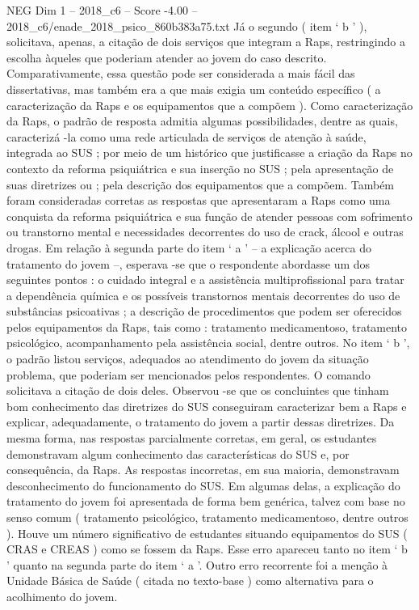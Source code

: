 \begin{textsample}{NEG Dim 1 – 2018\_c6 – Score -4.00 – 2018\_c6/enade\_2018\_psico\_860b383a75.txt}
Já o segundo ( item ‘ b ’ ), solicitava, apenas, a citação de dois serviços que integram a Raps, restringindo a escolha àqueles que poderiam atender ao jovem do caso descrito.
Comparativamente, essa questão pode ser considerada a mais fácil das dissertativas, mas também era a que mais exigia um conteúdo específico ( a caracterização da Raps e os equipamentos que a compõem ).
Como caracterização da Raps, o padrão de resposta admitia algumas possibilidades, dentre as quais, caracterizá -la como uma rede articulada de serviços de atenção à saúde, integrada ao SUS ; por meio de um histórico que justificasse a criação da Raps no contexto da reforma psiquiátrica e sua inserção no SUS ; pela apresentação de suas diretrizes ou ; pela descrição dos equipamentos que a compõem.
Também foram consideradas corretas as respostas que apresentaram a Raps como uma conquista da reforma psiquiátrica e sua função de atender pessoas com sofrimento ou transtorno mental e necessidades decorrentes do uso de crack, álcool e outras drogas.
Em relação à segunda parte do item ‘ a ’ – a explicação acerca do tratamento do jovem –, esperava -se que o respondente abordasse um dos seguintes pontos : o cuidado integral e a assistência multiprofissional para tratar a dependência química e os possíveis transtornos mentais decorrentes do uso de substâncias psicoativas ; a descrição de procedimentos que podem ser oferecidos pelos equipamentos da Raps, tais como : tratamento medicamentoso, tratamento psicológico, acompanhamento pela assistência social, dentre outros.
No item ‘ b ’, o padrão listou serviços, adequados ao atendimento do jovem da situação problema, que poderiam ser mencionados pelos respondentes.
O comando solicitava a citação de dois deles.
Observou -se que os concluintes que tinham bom conhecimento das diretrizes do SUS conseguiram caracterizar bem a Raps e explicar, adequadamente, o tratamento do jovem a partir dessas diretrizes.
Da mesma forma, nas respostas parcialmente corretas, em geral, os estudantes demonstravam algum conhecimento das características do SUS e, por consequência, da Raps.
As respostas incorretas, em sua maioria, demonstravam desconhecimento do funcionamento do SUS.
Em algumas delas, a explicação do tratamento do jovem foi apresentada de forma bem genérica, talvez com base no senso comum ( tratamento psicológico, tratamento medicamentoso, dentre outros ).
Houve um número significativo de estudantes situando equipamentos do SUS ( CRAS e CREAS ) como se fossem da Raps.
Esse erro apareceu tanto no item ‘ b ’ quanto na segunda parte do item ‘ a ’.
Outro erro recorrente foi a menção à Unidade Básica de Saúde ( citada no texto-base ) como alternativa para o acolhimento do jovem.

\end{textsample}
